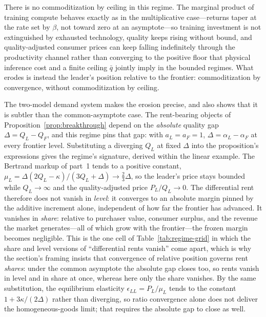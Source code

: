 \documentclass[11pt]{article}
\begin{document}
There is no commoditization by ceiling in this regime. The marginal product of training compute behaves exactly as in the multiplicative case---returns taper at the rate set by $\beta$, not toward zero at an asymptote---so training investment is not extinguished by exhausted technology, quality keeps rising without bound, and quality-adjusted consumer prices can keep falling indefinitely through the productivity channel rather than converging to the positive floor that physical inference cost and a finite ceiling $\bar q$ jointly imply in the bounded regimes. What erodes is instead the leader's position relative to the frontier: commoditization by convergence, without commoditization by ceiling.

The two-model demand system makes the erosion precise, and also shows that it is subtler than the common-asymptote case. The rent-bearing objects of Proposition~\ref{prop:breakthrough} depend on the \emph{absolute} quality gap $\Delta=Q_L-Q_F$, and this regime pins that gap: with $a_L=a_F=1$, $\Delta=\alpha_L-\alpha_F$ at every frontier level. Substituting a diverging $Q_L$ at fixed $\Delta$ into the proposition's expressions gives the regime's signature, derived within the linear example. The Bertrand markup of part~1 tends to a positive constant, $\mu_L=\Delta(2Q_L-\kappa)/(3Q_L+\Delta)\rightarrow\tfrac{2}{3}\Delta$, so the leader's price stays bounded while $Q_L\rightarrow\infty$ and the quality-adjusted price $P_L/Q_L\rightarrow0$. The differential rent therefore does not vanish in \emph{level}: it converges to an absolute margin pinned by the additive increment alone, independent of how far the frontier has advanced. It vanishes in \emph{share}: relative to purchaser value, consumer surplus, and the revenue the market generates---all of which grow with the frontier---the frozen margin becomes negligible. This is the one cell of Table~\ref{tab:regime-grid} in which the share and level versions of ``differential rents vanish'' come apart, which is why the section's framing insists that convergence of relative position governs rent \emph{shares}: under the common asymptote the absolute gap closes too, so rents vanish in level and in share at once, whereas here only the share vanishes. By the same substitution, the equilibrium elasticity $\epsilon_{LL}=P_L/\mu_L$ tends to the constant $1+3\kappa/(2\Delta)$ rather than diverging, so ratio convergence alone does not deliver the homogeneous-goods limit; that requires the absolute gap to close as well.
\end{document}
